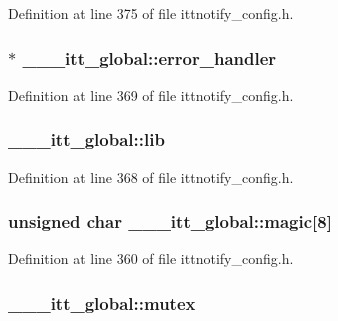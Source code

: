 Definition at line 375 of file ittnotify\-\_\-config.\-h.

\hypertarget{struct______itt__global_a5218b05dd00a757cd30e4a324d5a0305}{
\subsubsection[{error\-\_\-handler}]{$\ast$ \-\_\-\-\_\-\-\_\-itt\-\_\-global\-::error\-\_\-handler}}\label{struct______itt__global_a5218b05dd00a757cd30e4a324d5a0305}


Definition at line 369 of file ittnotify\-\_\-config.\-h.

\hypertarget{struct______itt__global_acd607182b03ee49400b6a4ffa69ae5db}{
\subsubsection[{lib}]{ \-\_\-\-\_\-\-\_\-itt\-\_\-global\-::lib}}\label{struct______itt__global_acd607182b03ee49400b6a4ffa69ae5db}


Definition at line 368 of file ittnotify\-\_\-config.\-h.

\hypertarget{struct______itt__global_ab0e52e46d4af19f31c990bedcd6948df}{
\subsubsection[{magic}]{\setlength{\rightskip}{0pt plus 5cm}unsigned char \-\_\-\-\_\-\-\_\-itt\-\_\-global\-::magic\mbox{[}8\mbox{]}}}\label{struct______itt__global_ab0e52e46d4af19f31c990bedcd6948df}


Definition at line 360 of file ittnotify\-\_\-config.\-h.

\hypertarget{struct______itt__global_ad09e87e07b15a780422e4ae565e06c5e}{
\subsubsection[{mutex}]{ \-\_\-\-\_\-\-\_\-itt\-\_\-global\-::mutex}}\label{struct______itt__global_ad09e87e07b15a780422e4ae565e06c5e}


